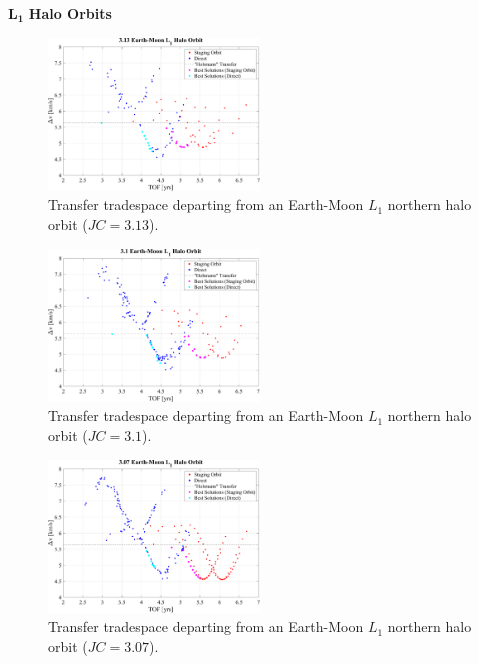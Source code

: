 $\pmb{L_{1}}$ \textbf{Halo Orbits}
\begin{figure}[ht]
    \centering
    \includegraphics[width=0.5\textwidth]{figures/TradeSpace_L1Halo_3_13.pdf}
    \caption{Transfer tradespace departing from an Earth-Moon $L_{1}$ northern halo orbit ($JC=3.13$).}
\end{figure}

\begin{figure}[ht]
    \centering
    \includegraphics[width=0.5\textwidth]{figures/TradeSpace_L1Halo_3_10.pdf}
    \caption{Transfer tradespace departing from an Earth-Moon $L_{1}$ northern halo orbit ($JC=3.1$).}
\end{figure}
\clearpage

\begin{figure}[ht]
    \centering
    \includegraphics[width=0.5\textwidth]{figures/TradeSpace_L1Halo_3_07.pdf}
    \caption{Transfer tradespace departing from an Earth-Moon $L_{1}$ northern halo orbit ($JC=3.07$).}
\end{figure}

